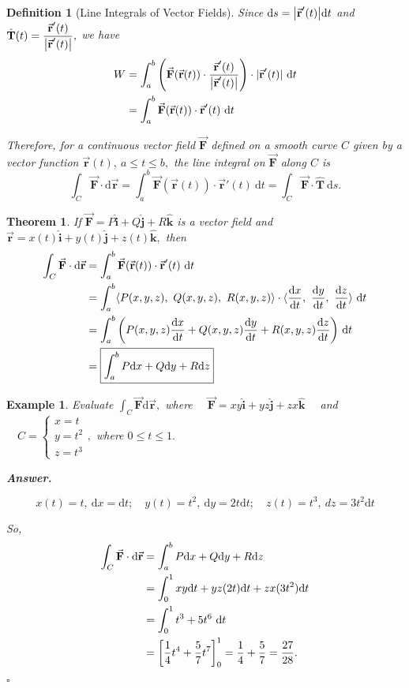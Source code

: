 \documentclass[12pt,a4paper]{article}
\newtheorem{thm}{Theorem}[subsection]
\newtheorem{df}{Definition}[subsection]
\newtheorem{eg}{Example}[subsection]
\newenvironment*{ans}{\par\indent\textbf{\textit{Answer. }}\par}{\par\hfill{$\square$}\par}
\def\dsst{\displaystyle}
\def\d{{\mathrm{d}}}
\def\dx{\d x}
\def\dy{\d y}
\def\dz{\d z}
\def\ds{\d s}
\def\dt{\d t}
\def\intC{\dsst\int_C}
\def\vecr{\vec{\boldsymbol{\textbf{r}}}}
\def\veci{\hat{\boldsymbol{\textbf{i}}}}
\def\vecj{\hat{\boldsymbol{\textbf{j}}}}
\def\veck{\hat{\boldsymbol{\textbf{k}}}}
\def\F{\vec{\boldsymbol{\textbf{F}}}}
\def\T{\hat{\boldsymbol{\textbf{T}}}}
\begin{document}
\begin{df}[Line Integrals of Vector Fields]
	\noindent Since $\ds=\qty|\vecr'(t)|\dt$ and $\T(t)=\dfrac{\vecr'(t)}{\qty|\vecr'(t)|},$ we have \[\begin{aligned}W&=\int_a^b\qty(\F(\vecr(t))\cdot\dfrac{\vecr'(t)}{\qty|\vecr'(t)|})\cdot|\vecr'(t)|\ \dt\\&=\int_a^b\F(\vecr(t))\cdot\vecr'(t)\ \dt\end{aligned}\]
	\begin{framed}
	\noindent Therefore, for a continuous vector field $\F$ defined on a smooth curve $C$ given by a vector function $\vecr(t),\ a\leq t\leq b,$ the line integral on $\F$ along $C$ is \[\intC\F\cdot\d\vecr=\int_a^b\F(\vecr(t))\cdot\vecr'(t)\ \dt=\intC\F\cdot\T\ \ds.\] 
	\end{framed}
\end{df}
\begin{thm}
	If $\F=P\veci+Q\vecj+R\veck$ is a vector field and $\vecr=x(t)\veci+y(t)\vecj+z(t)\veck,$ then \[\begin{aligned}\intC\F\cdot\d\vecr&=\int_a^b\F(\vecr(t))\cdot\vecr'(t)\ \dt\\&=\int_a^b\langle P(x,y,z),\ Q(x,y,z),\ R(x,y,z)\rangle\cdot\langle\dv{x}{t},\ \dv{y}{t},\ \dv{z}{t}\rangle\ \dt\\&=\int_a^b\qty(P(x,y,z)\dv{x}{t}+Q(x,y,z)\dv{y}{t}+R(x,y,z)\dv{z}{t})\ \dt\\&=\boxed{\int_a^bP\dx+Q\dy+R\dz}\end{aligned}\]	
\end{thm}
\begin{eg}
	Evaluate $\intC\F\d\vecr,$ where $\quad\F=xy\veci+yz\vecj+zx\veck\quad$ and $\quad C=\begin{cases}x=t\\y=t^2\\z=t^3\end{cases},$ where $0\leq t\leq1.$
	\begin{ans}
		\[x(t)=t,\ \dx=\dt;\quad y(t)=t^2,\ \dy=2t\dt;\quad z(t)=t^3,\ dz=3t^2\dt\]\par So, \[\begin{aligned}\intC\F\cdot\d\vecr&=\int_a^bP\dx+Q\dy+R\dz\\&=\int_0^1xy\dt+yz(2t)\dt+zx(3t^2)\dt\\&=\int_0^1t^3+5t^6\ \dt\\&=\qty[\dfrac{1}{4}t^4+\dfrac{5}{7}t^7]_0^1=\dfrac{1}{4}+\dfrac{5}{7}=\dfrac{27}{28}.\end{aligned}\]
	\end{ans}
\end{eg}
\end{document}
